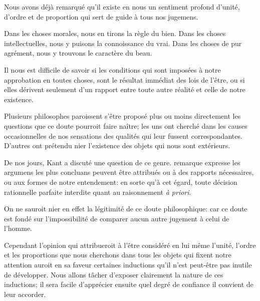 \documentclass[11pt,a4paper]{article}
\begin{document}
Nous avons déjà remarqué qu'il existe en nous un sentiment profond
d'unité, d'ordre et de proportion qui sert de guide à tous nos jugemens.

Dans les choses morales, nous en tirons la règle du bien. Dans les
choses intellectuelles, nous y puisons la connoissance du vrai. Dans les
choses de pur agrément, nous y trouvons le caractère du beau.

Il nous est  difficile de savoir si les
conditions qui sont imposées à notre approbation en toutes choses, sont
le résultat  immédiat des lois de l'être, ou si elles
dérivent seulement d'un rapport entre toute autre réalité et celle de
notre existence.

Plusieurs philosophes paroissent s'être proposé plus ou moins
directement les questions que ce doute pourroit faire naître; les uns
ont cherché dans les causes occasionnelles de nos sensations des
qualités qui leur fussent correspondantes. D'autres ont prétendu nier
l'existence des objets qui nous sont extérieurs.

De nos jours, Kant  a discuté une question de
ce genre.    remarque expresse
 les argumens les plus concluans peuvent être attribués ou
à des rapports nécessaires, ou aux formes de notre entendement: en
sorte qu'à cet égard, toute décision rationnelle  parfaite
 interdite quant au raisonnement \emph{à priori}.

On ne sauroit nier en effet la légitimité de ce doute philosophique: car
 ce doute est fondé sur l'impossibilité de comparer aucun
autre jugement à celui de l'homme.

Cependant l'opinion qui attribueroit à l'être considéré en lui même
l'unité, l'ordre et les proportions que nous cherchons dans tous les
objets  qui fixent notre attention auroit en
sa faveur certaines inductions qu'il n'est peut-être pas inutile de
développer. Nous allons tâcher d'exposer clairement la nature de ces
inductions; il sera facile  d'apprécier ensuite quel degré
de confiance il convient de leur accorder.
\end{document}
